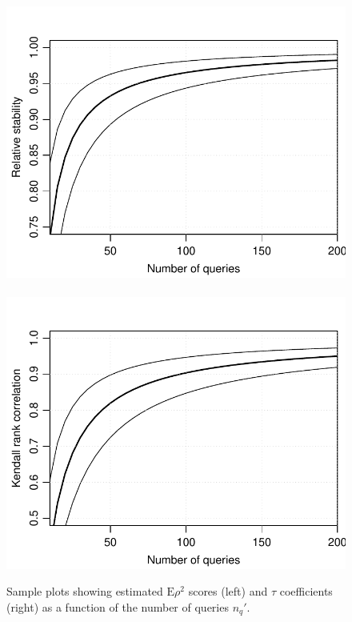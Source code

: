\documentclass[twoside]{article}
\begin{document}
\begin{figure}[b]%
\centering\includegraphics[scale=0.5]{plot.pdf}~~\includegraphics[scale=0.5]{plot2.pdf}%
\caption{Sample plots showing estimated $\text{E}\rho^2$ scores (left) and $\tau$ coefficients (right) as a function of the number of queries $n_q'$.}%
\label{fig:plot}%
\end{figure}
\end{document}
